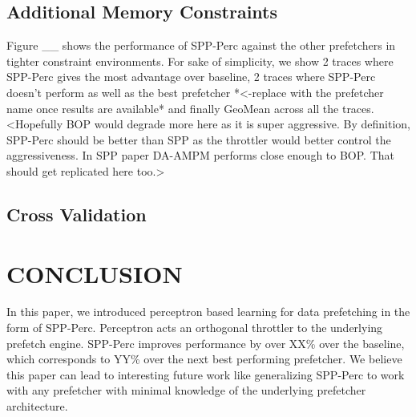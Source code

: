 \documentclass{sig-alternate}
\begin{document}
\subsection{Additional Memory Constraints}
Figure \_\_ shows the performance of SPP-Perc against the other prefetchers in tighter constraint environments. 
For sake of simplicity, we show 2 traces where SPP-Perc gives the most advantage over baseline, 2 traces where SPP-Perc doesn't perform as well as the best prefetcher *<-replace with the prefetcher name once results are available* and finally GeoMean across all the traces. 
<Hopefully BOP would degrade more here as it is super aggressive. 
By definition, SPP-Perc should be better than SPP as the throttler would better control the aggressiveness. 
In SPP paper DA-AMPM performs close enough to BOP. That should get replicated here too.>

\subsection{Cross Validation}


\section{CONCLUSION}
In this paper, we introduced perceptron based learning for data prefetching in the form of SPP-Perc. 
Perceptron acts an orthogonal throttler to the underlying prefetch engine. 
SPP-Perc improves performance by over XX\% over the baseline, which corresponds to YY\% over the next best performing prefetcher. 
We believe this paper can lead to interesting future work like generalizing SPP-Perc to work with any prefetcher with minimal knowledge of the underlying prefetcher architecture.


\end{document}
